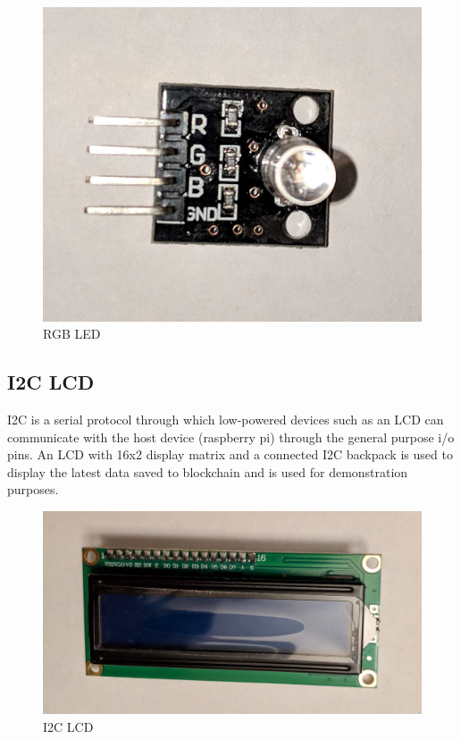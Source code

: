 \documentclass[11pt,openright]{report}
\begin{document}
\begin{figure}
    \centering
    \includegraphics[scale=0.1]{images/rgb_led.jpg}
    \caption{RGB LED}
    \label{fig:rgb_led}
\end{figure}

\subsection{I2C LCD}
I2C is a serial protocol through which low-powered devices such as an LCD can communicate with the host device (raspberry pi) through the general purpose i/o pins. 
An LCD with 16x2 display matrix and a connected I2C backpack is used to display the latest data saved to blockchain and is used for demonstration purposes. 
\begin{figure}
    \centering
    \includegraphics[scale=0.1]{images/i2c_lcd.jpg}
    \caption{I2C LCD}
    \label{fig:i2c_lcd}
\end{figure}
\end{document}
